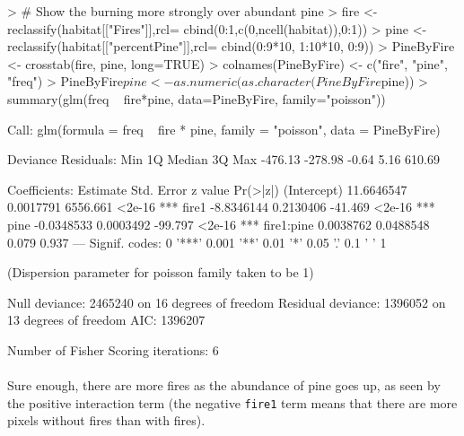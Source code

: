 \documentclass{article}
\begin{document}
\begin{Schunk}
\begin{Sinput}
> # Show the burning more strongly over abundant pine
> fire <- reclassify(habitat[["Fires"]],rcl= cbind(0:1,c(0,ncell(habitat)),0:1))
> pine <- reclassify(habitat[["percentPine"]],rcl= cbind(0:9*10, 1:10*10, 0:9))
> PineByFire <- crosstab(fire, pine, long=TRUE)
> colnames(PineByFire) <- c("fire", "pine", "freq")
> PineByFire$pine <- as.numeric(as.character(PineByFire$pine))
> summary(glm(freq ~ fire*pine, data=PineByFire, family="poisson"))
\end{Sinput}
\begin{Soutput}
Call:
glm(formula = freq ~ fire * pine, family = "poisson", data = PineByFire)

Deviance Residuals: 
    Min       1Q   Median       3Q      Max  
-476.13  -278.98    -0.64     5.16   610.69  

Coefficients:
              Estimate Std. Error  z value Pr(>|z|)    
(Intercept) 11.6646547  0.0017791 6556.661   <2e-16 ***
fire1       -8.8346144  0.2130406  -41.469   <2e-16 ***
pine        -0.0348533  0.0003492  -99.797   <2e-16 ***
fire1:pine   0.0038762  0.0488548    0.079    0.937    
---
Signif. codes:  0 '***' 0.001 '**' 0.01 '*' 0.05 '.' 0.1 ' ' 1

(Dispersion parameter for poisson family taken to be 1)

    Null deviance: 2465240  on 16  degrees of freedom
Residual deviance: 1396052  on 13  degrees of freedom
AIC: 1396207

Number of Fisher Scoring iterations: 6
\end{Soutput}
\end{Schunk}

\paragraph{}
Sure enough, there are more fires as the abundance of pine goes up, as seen by the positive interaction term (the negative \texttt{fire1} term means that there are more pixels without fires than with fires).
\end{document}

